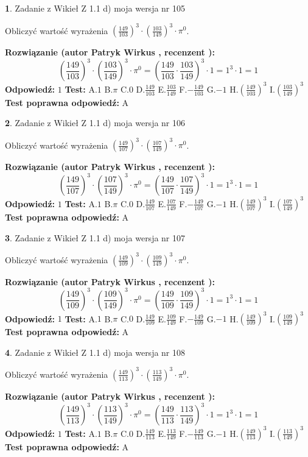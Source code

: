 \documentclass[12pt, a4paper]{article}
\theoremstyle{definition} %
\newtheorem{zad}{}
\newcommand{\zadStart}[1]{\begin{zad}#1\newline}
\newcommand{\zadStop}{\end{zad}}
\newcommand{\rozwStart}[2]{\noindent \textbf{Rozwiązanie (autor #1 , recenzent #2): }\newline}
\newcommand{\rozwStop}{\newline}
\newcommand{\odpStart}{\noindent \textbf{Odpowiedź:}\newline}
\newcommand{\odpStop}{\newline}
\newcommand{\testStart}{\noindent \textbf{Test:}\newline}
\newcommand{\testStop}{\newline}
\newcommand{\kluczStart}{\noindent \textbf{Test poprawna odpowiedź:}\newline}
\newcommand{\kluczStop}{\newline}
\begin{document}
\zadStart{Zadanie z Wikieł Z 1.1 d) moja wersja nr 105}

Obliczyć wartość wyrażenia $(\frac{149}{103})^{3} \cdot (\frac{103}{149})^{3} \cdot \pi^{0}$.
\zadStop
\rozwStart{Patryk Wirkus}{}
$$(\frac{149}{103})^{3} \cdot (\frac{103}{149})^{3} \cdot \pi^{0} = (\frac{149}{103} \cdot \frac{103}{149})^{3} \cdot 1 = 1^{3} \cdot 1 = 1$$
\rozwStop
\odpStart
$1$
\odpStop
\testStart
A.$1$ B.$\pi$ C.$0$ D.$\frac{149}{103}$ E.$\frac{103}{149}$
F.$-\frac{149}{103}$ G.$-1$
H.$(\frac{149}{103})^{3}$
I.$(\frac{103}{149})^{3}$
\testStop
\kluczStart
A
\kluczStop



\zadStart{Zadanie z Wikieł Z 1.1 d) moja wersja nr 106}

Obliczyć wartość wyrażenia $(\frac{149}{107})^{3} \cdot (\frac{107}{149})^{3} \cdot \pi^{0}$.
\zadStop
\rozwStart{Patryk Wirkus}{}
$$(\frac{149}{107})^{3} \cdot (\frac{107}{149})^{3} \cdot \pi^{0} = (\frac{149}{107} \cdot \frac{107}{149})^{3} \cdot 1 = 1^{3} \cdot 1 = 1$$
\rozwStop
\odpStart
$1$
\odpStop
\testStart
A.$1$ B.$\pi$ C.$0$ D.$\frac{149}{107}$ E.$\frac{107}{149}$
F.$-\frac{149}{107}$ G.$-1$
H.$(\frac{149}{107})^{3}$
I.$(\frac{107}{149})^{3}$
\testStop
\kluczStart
A
\kluczStop



\zadStart{Zadanie z Wikieł Z 1.1 d) moja wersja nr 107}

Obliczyć wartość wyrażenia $(\frac{149}{109})^{3} \cdot (\frac{109}{149})^{3} \cdot \pi^{0}$.
\zadStop
\rozwStart{Patryk Wirkus}{}
$$(\frac{149}{109})^{3} \cdot (\frac{109}{149})^{3} \cdot \pi^{0} = (\frac{149}{109} \cdot \frac{109}{149})^{3} \cdot 1 = 1^{3} \cdot 1 = 1$$
\rozwStop
\odpStart
$1$
\odpStop
\testStart
A.$1$ B.$\pi$ C.$0$ D.$\frac{149}{109}$ E.$\frac{109}{149}$
F.$-\frac{149}{109}$ G.$-1$
H.$(\frac{149}{109})^{3}$
I.$(\frac{109}{149})^{3}$
\testStop
\kluczStart
A
\kluczStop



\zadStart{Zadanie z Wikieł Z 1.1 d) moja wersja nr 108}

Obliczyć wartość wyrażenia $(\frac{149}{113})^{3} \cdot (\frac{113}{149})^{3} \cdot \pi^{0}$.
\zadStop
\rozwStart{Patryk Wirkus}{}
$$(\frac{149}{113})^{3} \cdot (\frac{113}{149})^{3} \cdot \pi^{0} = (\frac{149}{113} \cdot \frac{113}{149})^{3} \cdot 1 = 1^{3} \cdot 1 = 1$$
\rozwStop
\odpStart
$1$
\odpStop
\testStart
A.$1$ B.$\pi$ C.$0$ D.$\frac{149}{113}$ E.$\frac{113}{149}$
F.$-\frac{149}{113}$ G.$-1$
H.$(\frac{149}{113})^{3}$
I.$(\frac{113}{149})^{3}$
\testStop
\kluczStart
A
\kluczStop
\end{document}

